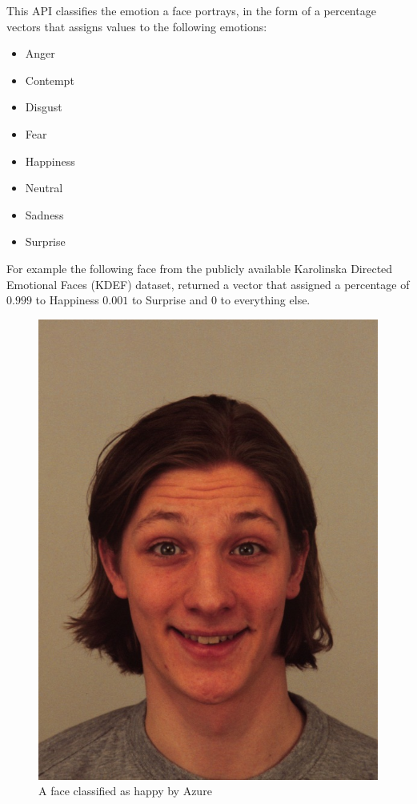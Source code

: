 \documentclass[a4paper,11pt]{article}
\begin{document}
        This API classifies the emotion a face portrays, in the form of a percentage vectors that assigns values to the following emotions:
            \begin{itemize}
                \item Anger
                \item Contempt
                \item Disgust
                \item Fear
                \item Happiness
                \item Neutral
                \item Sadness
                \item Surprise
            \end{itemize}
        For example the following face from the publicly available Karolinska Directed Emotional Faces (KDEF) dataset, returned a vector that assigned a percentage of $0.999$ to Happiness $0.001$ to Surprise and $0$ to everything else.
            \begin{figure}[h!]
                    \centering      \includegraphics[scale=0.2]{exercise_3/paper/images/AM18HAS.JPG}
                    \caption{A face classified as happy by Azure}
                    \label{fig:Happy_face}
            \end{figure}
        
\end{document}

